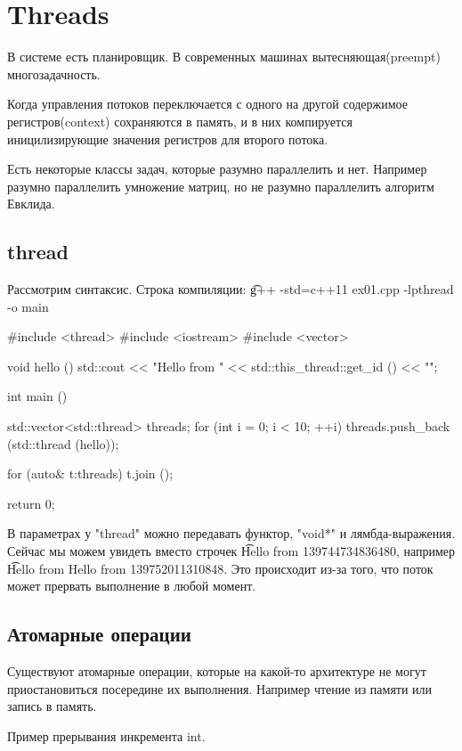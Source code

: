 \chapter{Threads}
В системе есть планировщик.
В современных машинах вытесняющая(preempt) многозадачность.

Когда управления потоков переключается с одного на другой содержимое регистров(context) сохраняются в память, и в них компируется иницилизирующие значения регистров для второго потока. 

Есть некоторые классы задач, которые разумно параллелить и нет. 
Например разумно параллелить умножение матриц, но не разумно параллелить алгоритм Евклида.

\section{thread}

Рассмотрим синтаксис.
Строка компиляции: \t{g++ -std=c++11  ex01.cpp -lpthread -o main}

\begin{cppcode}
#include <thread>
#include <iostream>
#include <vector>

void hello () {
  std::cout << "Hello from " << std::this_thread::get_id () << "\n";
}

int main () {
  std::vector<std::thread> threads;
  for (int i = 0; i < 10; ++i) {
    threads.push_back (std::thread (hello));
  }

  for (auto& t:threads) {
    t.join ();
  }

  return 0;
}
\end{cppcode}

В параметрах у \cpp"thread" можно передавать функтор, \cpp"void*" и лямбда-выражения.
Сейчас мы можем увидеть вместо строчек \t{Hello from 139744734836480}, например \t{Hello from Hello from 139752011310848}.
Это происходит из-за того, что поток может прервать выполнение в любой момент. 


\section{Атомарные операции}

Существуют атомарные операции, которые на какой-то архитектуре не могут приостановиться посередине их выполнения.
Например чтение из памяти или запись в память.

Пример прерывания инкремента int.

